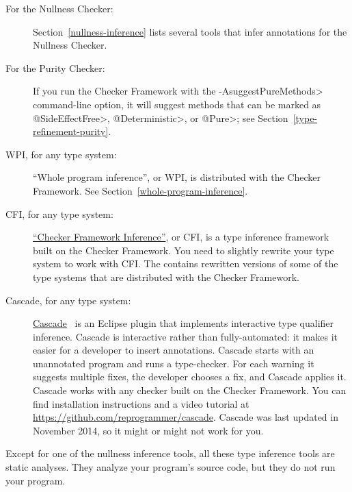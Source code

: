 \begin{description}
  \item[For the Nullness Checker:]
Section~\ref{nullness-inference} lists several tools that infer
annotations for the Nullness Checker.

\item[For the Purity Checker:]
If you run the Checker Framework with the \<-AsuggestPureMethods>
command-line option, it will suggest methods that can be marked as
\<@SideEffectFree>, \<@Deterministic>, or \<@Pure>; see
Section~\ref{type-refinement-purity}.

\item[WPI, for any type system:]
``Whole program inference'', or WPI, is distributed with the Checker
  Framework.  See Section~\ref{whole-program-inference}.

\item[CFI, for any type system:]
\href{https://github.com/opprop/checker-framework-inference}{``Checker
  Framework Inference''}, or CFI, is a type inference framework built on
the Checker Framework.  You need to slightly rewrite your type system to
work with CFI\@.  The
 contains rewritten versions of some of
the type systems that are distributed with the Checker Framework.

\item[Cascade, for any type system:]
\href{https://github.com/reprogrammer/cascade/}{Cascade}~\cite{VakilianPEJ2014}
is an Eclipse plugin that implements interactive type qualifier inference.
Cascade is interactive rather than fully-automated:  it makes it easier for
a developer to insert annotations.
Cascade starts with an unannotated program and runs a type-checker.  For each
warning it suggests multiple fixes, the developer chooses a fix, and
Cascade applies it.  Cascade works with any checker built on the Checker
Framework.
You can find installation instructions and a video tutorial at \url{https://github.com/reprogrammer/cascade}.
Cascade was last updated in November 2014, so it might or might not work for you.

\end{description}

Except for one of the nullness inference tools, all these
type inference tools are static analyses.  They analyze your program's
source code, but they do not run your program.


